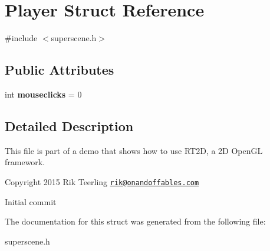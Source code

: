 \hypertarget{struct_player}{}\section{Player Struct Reference}
\label{struct_player}


{\ttfamily \#include $<$superscene.\+h$>$}

\subsection*{Public Attributes}
\begin{DoxyCompactItemize}
\item 
\mbox{\label{struct_player_a74db0ea8732ec5ab3f1575798af3aa1a}} 
int {\bfseries mouseclicks} = 0
\end{DoxyCompactItemize}


\subsection{Detailed Description}
This file is part of a demo that shows how to use R\+T2D, a 2D Open\+GL framework.


\begin{DoxyItemize}
\item Copyright 2015 Rik Teerling \href{mailto:rik@onandoffables.com}{\tt rik@onandoffables.\+com}
\begin{DoxyItemize}
\item Initial commit 
\end{DoxyItemize}
\end{DoxyItemize}

The documentation for this struct was generated from the following file\+:\begin{DoxyCompactItemize}
\item 
superscene.\+h\end{DoxyCompactItemize}
